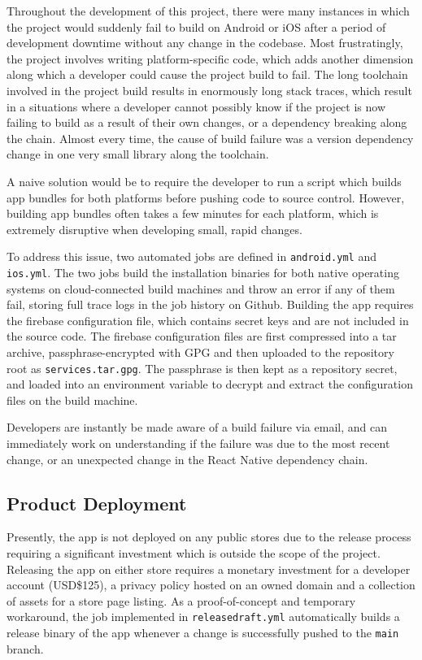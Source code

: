 Throughout the development of this project, there were many instances in which the project would suddenly fail to build on Android or iOS after a period of development downtime without any change in the codebase. Most frustratingly, the project involves writing platform-specific code, which adds another dimension along which a developer could cause the project build to fail. The long toolchain involved in the project build results in enormously long stack traces, which result in a situations where a developer cannot possibly know if the project is now failing to build as a result of their own changes, or a dependency breaking along the chain. Almost every time, the cause of build failure was a version dependency change in one very small library along the toolchain.

A naive solution would be to require the developer to run a script which builds app bundles for both platforms before pushing code to source control. However, building app bundles often takes a few minutes for each platform, which is extremely disruptive when developing small, rapid changes.

To address this issue, two automated jobs are defined in \texttt{android.yml} and \texttt{ios.yml}. The two jobs build the installation binaries for both native operating systems on cloud-connected build machines and throw an error if any of them fail, storing full trace logs in the job history on Github. Building the app requires the firebase configuration file, which contains secret keys and are not included in the source code. The firebase configuration files are first compressed into a tar archive, passphrase-encrypted with GPG and then uploaded to the repository root as \texttt{services.tar.gpg}. The passphrase is then kept as a repository secret, and loaded into an environment variable to decrypt and extract the configuration files on the build machine.

Developers are instantly be made aware of a build failure via email, and can immediately work on understanding if the failure was due to the most recent change, or an unexpected change in the React Native dependency chain.

\subsection{Product Deployment}
Presently, the app is not deployed on any public stores due to the release process requiring a significant investment which is outside the scope of the project. Releasing the app on either store requires a monetary investment for a developer account (USD\$125), a privacy policy hosted on an owned domain and a collection of assets for a store page listing. As a proof-of-concept and temporary workaround, the job implemented in \texttt{releasedraft.yml} automatically builds a release binary of the app whenever a change is successfully pushed to the \texttt{main} branch.

